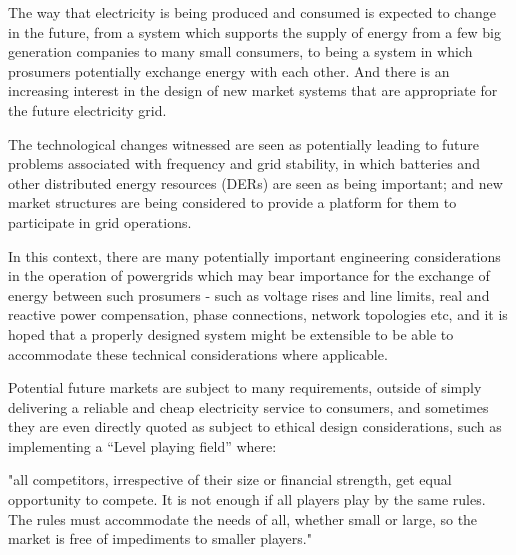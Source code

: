 

The way that electricity is being produced and consumed is expected to change in the future, from a system which supports the supply of energy from a few big generation companies to many small consumers, to being a system in which prosumers potentially exchange energy with each other.
And there is an increasing interest in the design of new market systems that are appropriate for the future electricity grid.

The technological changes witnessed are seen as potentially leading to future problems associated with frequency and grid stability, in which batteries and other distributed energy resources (DERs) are seen as being important; and new market structures are being considered to provide a platform for them to participate in grid operations.

In this context, there are many potentially important engineering considerations in the operation of powergrids which may bear importance for the exchange of energy between such prosumers - such as voltage rises and line limits, real and reactive power compensation, phase connections, network topologies etc, and it is hoped that a properly designed system might be extensible to be able to accommodate these technical considerations where applicable.

Potential future markets are subject to many requirements, outside of simply delivering a reliable and cheap electricity service to consumers, and sometimes they are even directly quoted as subject to ethical design considerations, such as implementing a ``Level playing field'' where:

"all competitors, irrespective of their size or financial strength, get equal opportunity to compete. It is not enough if all players play by the same rules. The rules must accommodate the needs of all, whether small or large, so the market is free of impediments to smaller players." \cite{australianenergymarketoperatorlimited2018}

